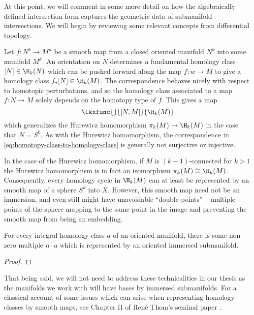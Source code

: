 At this point, we will comment in some more detail on how the algebraically defined intersection form captures the geometric data of submanifold intersections. We will begin by reviewing some relevant concepts from differential topology.

Let $f : N^k\to M^n$ be a smooth map from a closed oriented manifold $N^k$ into some manifold $M^k$. An orientation on $N$ determines a fundamental homology class $[N]\in \H_k(N)$ which can be pushed forward along the map $f : w \to M$ to give a homology class $f_* [N]\in \H_k(M)$. 
The correspondence behaves nicely with respect to homotopic perturbations, and so
the homology class associated to a map $f : N \to M$ solely depends on the homotopy type of $f$. This gives a map
\begin{equation}\label{eq:homotopy-class-to-homology-class}
	\lkxfunc{}{[N,M]}{\H_k(M)}
\end{equation}
which generalizes the Hurewicz homomorphism $\pi_k(M) \to \H_k(M)$ in the case that $N=S^k$.
As with the Hurewicz homomorphism, the correspondence in \cref{eq:homotopy-class-to-homology-class} is generally not surjective or injective. 

In the case of the Hurewicz homomorphism, if $M$ is $(k-1)$-connected for $k > 1$ the Hurewicz homomorphism is in fact an isomorphism $\pi_{k}(M) \cong \H_{k}(M)$. Consequently, every homology cycle in $\H_{k}(M)$ can at least be represented by an smooth map of a sphere $S^{k}$ into $X$. However, this smooth map need not be an immersion, and even still might have unavoidable ``double-points'' -- multiple points of the sphere mapping to the same point in the image and preventing the smooth map from being an embedding.

\begin{theorem}[Thom]
	For every integral homology class $a$ of an oriented manifold, there is some non-zero multiple $n\cdot a$ which is represented by an oriented immersed submanifold.
\end{theorem}
\begin{proof}
\end{proof}

That being said, we will not need to address these technicalities in our thesis as the manifolds we work with will have bases by immersed submanifolds. For a classical account of some issues which can arise when representing homology classes by smooth maps, see Chapter II of Ren\'e Thom's seminal paper \cite{thom1954}.

